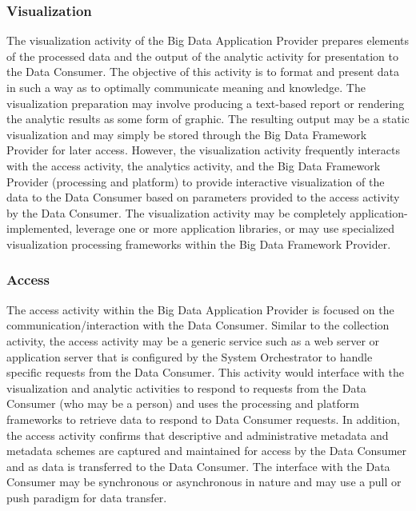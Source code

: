 \documentclass[11pt]{article}
\begin{document}
\subsubsection{Visualization}

The visualization activity of the Big Data Application Provider prepares elements of the processed data 
and the output of the analytic activity for presentation to the Data Consumer. The objective of this activity 
is to format and present data in such a way as to optimally communicate meaning and knowledge. The 
visualization preparation may involve producing a text-based report or rendering the analytic results as 
some form of graphic. The resulting output may be a static visualization and may simply be stored 
through the Big Data Framework Provider for later access. However, the visualization activity frequently 
interacts with the access activity, the analytics activity, and the Big Data Framework Provider (processing 
and platform) to provide interactive visualization of the data to the Data Consumer based on parameters 
provided to the access activity by the Data Consumer. The visualization activity may be completely 
application-implemented, leverage one or more application libraries, or may use specialized visualization 
processing frameworks within the Big Data Framework Provider. 

\subsubsection{Access}

The access activity within the Big Data Application Provider is focused on the communication/interaction 
with the Data Consumer. Similar to the collection activity, the access activity may be a generic service 
such as a web server or application server that is configured by the System Orchestrator to handle specific 
requests from the Data Consumer. This activity would interface with the visualization and analytic 
activities to respond to requests from the Data Consumer (who may be a person) and uses the processing 
and platform frameworks to retrieve data to respond to Data Consumer requests. In addition, the access 
activity confirms that descriptive and administrative metadata and metadata schemes are captured and 
maintained for access by the Data Consumer and as data is transferred to the Data Consumer. The 
interface with the Data Consumer may be synchronous or asynchronous in nature and may use a pull or 
push paradigm for data transfer. 
\end{document}
